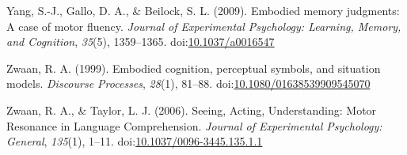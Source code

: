 \documentclass[english,man]{apa6}
\theoremstyle{definition}
\theoremstyle{definition}
\theoremstyle{definition}
\theoremstyle{remark}
\begin{document}
\hypertarget{ref-Yang2009}{}
Yang, S.-J., Gallo, D. A., \& Beilock, S. L. (2009). Embodied memory
judgments: A case of motor fluency. \emph{Journal of Experimental
Psychology: Learning, Memory, and Cognition}, \emph{35}(5), 1359--1365.
doi:\href{https://doi.org/10.1037/a0016547}{10.1037/a0016547}

\hypertarget{ref-Zwaan1999}{}
Zwaan, R. A. (1999). Embodied cognition, perceptual symbols, and
situation models. \emph{Discourse Processes}, \emph{28}(1), 81--88.
doi:\href{https://doi.org/10.1080/01638539909545070}{10.1080/01638539909545070}

\hypertarget{ref-Zwaan2006}{}
Zwaan, R. A., \& Taylor, L. J. (2006). Seeing, Acting, Understanding:
Motor Resonance in Language Comprehension. \emph{Journal of Experimental
Psychology: General}, \emph{135}(1), 1--11.
doi:\href{https://doi.org/10.1037/0096-3445.135.1.1}{10.1037/0096-3445.135.1.1}
\end{document}
